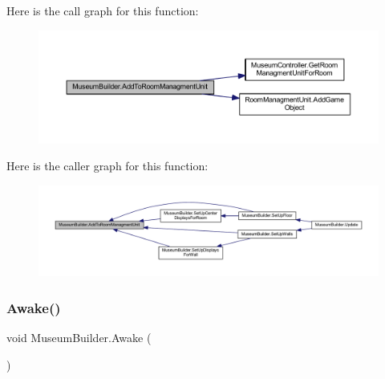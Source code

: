 Here is the call graph for this function\+:
\nopagebreak
\begin{figure}[H]
\begin{center}
\leavevmode
\includegraphics[width=350pt]{class_museum_builder_ad1991ecd1258a2eb6d020d3c429ad9c8_cgraph}
\end{center}
\end{figure}
Here is the caller graph for this function\+:
\nopagebreak
\begin{figure}[H]
\begin{center}
\leavevmode
\includegraphics[width=350pt]{class_museum_builder_ad1991ecd1258a2eb6d020d3c429ad9c8_icgraph}
\end{center}
\end{figure}
\mbox{\label{class_museum_builder_a846546ea2e9bf91bba2a166dc2b01e2d}} 
\subsubsection{\texorpdfstring{Awake()}{Awake()}}
{\footnotesize\ttfamily void Museum\+Builder.\+Awake (\begin{DoxyParamCaption}{ }\end{DoxyParamCaption})\hspace{0.3cm}{\ttfamily [private]}}

\mbox{\label{class_museum_builder_a895b10deac965d8d7b936dd76d82484d}} 
